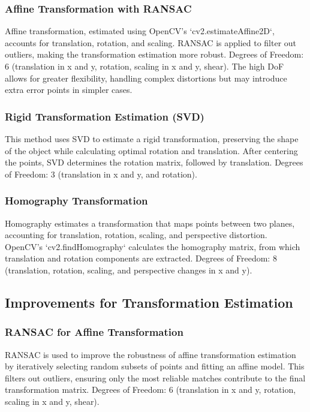 \subsubsection*{Affine Transformation with RANSAC}
Affine transformation, estimated using OpenCV's `cv2.estimateAffine2D`, accounts for translation, rotation, and scaling. RANSAC is applied to filter out outliers, making the transformation estimation more robust.  
Degrees of Freedom: 6 (translation in x and y, rotation, scaling in x and y, shear). The high DoF allows for greater flexibility, handling complex distortions but may introduce extra error points in simpler cases.

\subsubsection*{Rigid Transformation Estimation (SVD)}
This method uses SVD to estimate a rigid transformation, preserving the shape of the object while calculating optimal rotation and translation. After centering the points, SVD determines the rotation matrix, followed by translation.  
Degrees of Freedom: 3 (translation in x and y, and rotation).

\subsubsection*{Homography Transformation}
Homography estimates a transformation that maps points between two planes, accounting for translation, rotation, scaling, and perspective distortion. OpenCV's `cv2.findHomography` calculates the homography matrix, from which translation and rotation components are extracted.  
Degrees of Freedom: 8 (translation, rotation, scaling, and perspective changes in x and y). 

\subsection*{Improvements for Transformation Estimation}

\subsubsection*{RANSAC for Affine Transformation}
RANSAC is used to improve the robustness of affine transformation estimation by iteratively selecting random subsets of points and fitting an affine model. This filters out outliers, ensuring only the most reliable matches contribute to the final transformation matrix.  
Degrees of Freedom: 6 (translation in x and y, rotation, scaling in x and y, shear). 

